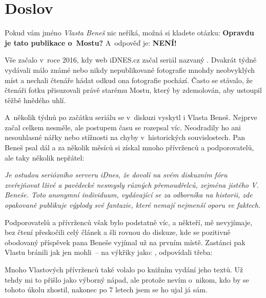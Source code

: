 




\chapter{Doslov}

Pokud vám jméno {\em Vlasta Beneš} nic neříká, možná si kladete otázku: {\bf Opravdu je
tato publikace o~Mostu?} A~odpověď je: {\bf NENÍ!}

Vše začalo v~roce 2016, kdy web iDNES.cz začal seriál nazvaný {\em
\from[100pohleduNaCesko]}.  Dvakrát týdně vydávali málo známé nebo nikdy
nepublikované fotografie mnohdy neobvyklých míst a nechali čtenáře hádat odkud
ona fotografie pochází. Často se stávalo, že čtenáři fotku přisuzovali právě
starému Mostu, který by zdemolován, aby ustoupil těžbě hnědého uhlí.

A~několik týdnů po začátku seriálu se v~diskuzi vyskytl i Vlasta Beneš. Nejprve
začal celkem nesměle, ale postupem času se rozepsal víc. Neodradily ho ani
nesouhlasné nářky  nebo stížnosti na chyby v~historických souvislostech. Pan
Beneš psal dál a za několik měsíců si získal mnoho přívrženců a podporovatelů,
ale taky několik nepřátel:

{\it Je ostudou seriózního serveru iDnes, že dovolí na svém diskuzním fóru
zveřejňovat lživé a pavědecké nesmysly různých přemoudřelců, zejména jistého V.
Beneše. Toto anonymní individuum, vydávající se za odborníka na historii, zde
opakovaně publikuje výplody své fantazie, které nemají nejmenší oporu ve
faktech.}

Podporovatelů a přívrženců však bylo podstatně víc, a někteří, mě nevyjímaje,
bez čtení přeskočili celý článek a šli rovnou do diskuze, kde se pozitivně
obodovaný příspěvek pana Beneše vyjímal už na prvním místě. Zastánci pak Vlastu
bránili jak jen mohli~-- na výkřiky jako: , odpovídali třeba: 

Mnoho Vlastových přívrženců také volalo po knižním vydání jeho textů. Už tehdy
mi to přišlo jako výborný nápad, ale protože nevím o~nikom, kdo by se tohoto
úkolu zhostil, nakonec po 7 letech jsem se ho ujal já sám.

